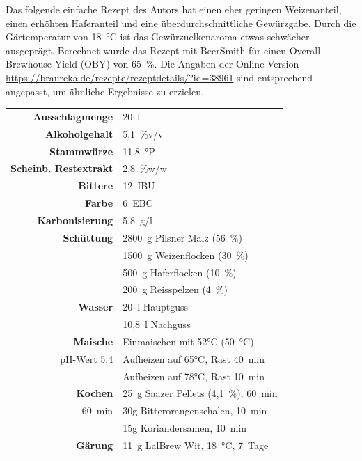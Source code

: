 \documentclass[a4paper,parskip=half]{scrartcl}
\begin{document}
Das folgende einfache Rezept des Autors hat einen eher geringen Weizenanteil,
einen erhöhten Haferanteil und eine überdurchschnittliche Gewürzgabe.
Durch die Gärtemperatur von 18~°C ist das Gewürznelkenaroma etwas schwächer
ausgeprägt.  Berechnet wurde das Rezept mit BeerSmith für einen Overall
Brewhouse Yield (OBY) von 65~\%. Die Angaben der Online-Version \url{https://braureka.de/rezepte/rezeptdetails/?id=38961} sind entsprechend
angepasst, um ähnliche Ergebnisse zu erzielen.

\begin{table}[H]
\centering
\begin{tabular}{rl}
\toprule
\textbf{Ausschlagmenge} & 20~l \\
\textbf{Alkoholgehalt} & 5,1~\%v/v \\
\textbf{Stammwürze} & 11,8~°P \\
\textbf{Scheinb. Restextrakt} & 2,8~\%w/w \\
\textbf{Bittere} & 12~IBU \\
\textbf{Farbe} & 6~EBC \\
\textbf{Karbonisierung} & 5,8~g/l \\
\midrule
\textbf{Schüttung} & 2800~g Pilsner Malz (56~\%) \\
 & 1500~g Weizenflocken (30~\%) \\
 & 500~g Haferflocken (10~\%) \\ 
 & 200~g Reisspelzen (4~\%) \\
\midrule
\textbf{Wasser} & 20~l Hauptguss \\
 & 10,8~l Nachguss \\
\midrule
\textbf{Maische} & Einmaischen mit 52°C (50~°C) \\
pH-Wert 5,4 & Aufheizen auf 65°C, Rast 40~min \\
 & Aufheizen auf 78°C, Rast 10~min \\
\midrule
\textbf{Kochen} & 25~g Saazer Pellets (4,1~\%), 60~min \\
60~min & 30g Bitterorangenschalen, 10~min \\
 & 15g Koriandersamen, 10~min \\
\midrule
\textbf{Gärung} & 11~g LalBrew Wit, 18~°C, 7~Tage \\
\bottomrule
\end{tabular}
\end{table}

\printbibliography[title=Quellen]
\end{document}
